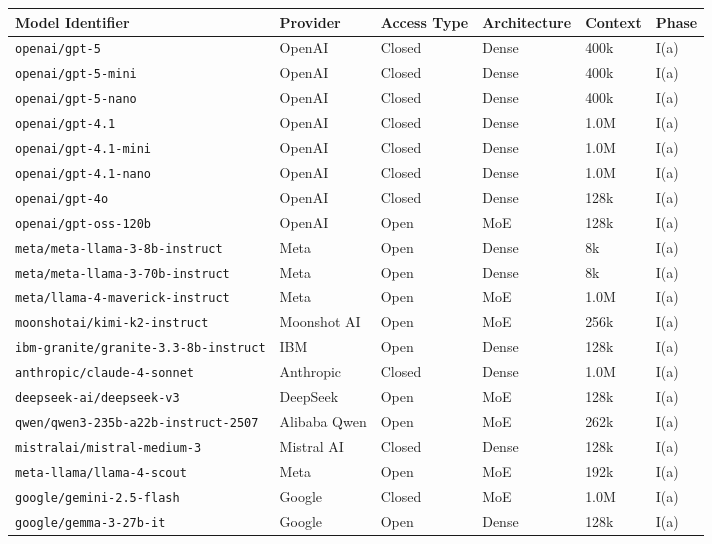 \documentclass[11pt]{article}
\begin{document}
\begin{table}[t!]
\centering
\small
\begin{tabular}{l l l l l l}
\toprule
\textbf{Model Identifier} & \textbf{Provider} & \textbf{Access Type} & \textbf{Architecture} & \textbf{Context} & \textbf{Phase} \\
\midrule
\texttt{openai/gpt-5} & OpenAI & Closed & Dense & 400k & I(a) \\
\texttt{openai/gpt-5-mini} & OpenAI & Closed & Dense & 400k & I(a) \\
\texttt{openai/gpt-5-nano} & OpenAI & Closed & Dense & 400k & I(a) \\
\texttt{openai/gpt-4.1} & OpenAI & Closed & Dense & 1.0M & I(a) \\
\texttt{openai/gpt-4.1-mini} & OpenAI & Closed & Dense & 1.0M & I(a) \\
\texttt{openai/gpt-4.1-nano} & OpenAI & Closed & Dense & 1.0M & I(a) \\
\texttt{openai/gpt-4o} & OpenAI & Closed & Dense & 128k & I(a) \\
\texttt{openai/gpt-oss-120b} & OpenAI & Open & MoE & 128k & I(a) \\
\texttt{meta/meta-llama-3-8b-instruct} & Meta & Open & Dense & 8k & I(a) \\
\texttt{meta/meta-llama-3-70b-instruct} & Meta & Open & Dense & 8k & I(a) \\
\texttt{meta/llama-4-maverick-instruct} & Meta & Open & MoE & 1.0M & I(a) \\
\texttt{moonshotai/kimi-k2-instruct} & Moonshot AI & Open & MoE & 256k & I(a) \\
\texttt{ibm-granite/granite-3.3-8b-instruct} & IBM & Open & Dense & 128k & I(a) \\
\texttt{anthropic/claude-4-sonnet} & Anthropic & Closed & Dense & 1.0M & I(a) \\
\texttt{deepseek-ai/deepseek-v3} & DeepSeek & Open & MoE & 128k & I(a) \\
\texttt{qwen/qwen3-235b-a22b-instruct-2507} & Alibaba Qwen & Open & MoE & 262k & I(a) \\
\texttt{mistralai/mistral-medium-3} & Mistral AI & Closed & Dense & 128k & I(a) \\
\texttt{meta-llama/llama-4-scout} & Meta & Open & MoE & 192k & I(a) \\
\texttt{google/gemini-2.5-flash} & Google & Closed & MoE & 1.0M & I(a) \\
\texttt{google/gemma-3-27b-it} & Google & Open & Dense & 128k & I(a) \\

\end{tabular}
\end{table}
\end{document}
